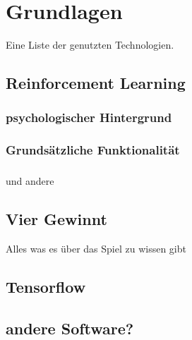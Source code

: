 \chapter{Grundlagen}%

\label{cha:Schluss}

Eine Liste der genutzten Technologien.

\section{Reinforcement Learning}
\subsection{psychologischer Hintergrund}

\subsection{Grundsätzliche Funktionalität}

\subsection{}
und andere
\section{Vier Gewinnt}
Alles was es über das Spiel zu wissen gibt

\section{Tensorflow}
\section{andere Software?}